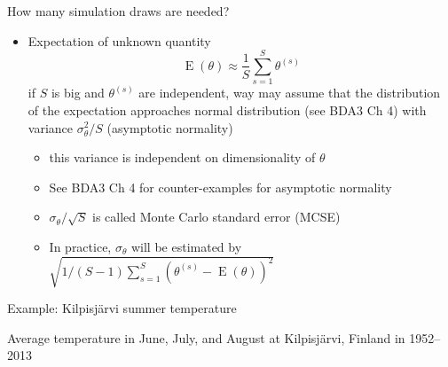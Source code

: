 \documentclass[english,t]{beamer}
\DeclareMathOperator{\E}{E}
\begin{document}
\begin{frame}{How many simulation draws are needed?}

  \begin{itemize}
  \item Expectation of unknown quantity
    \begin{equation*}
      \E(\theta)\approx \frac{1}{S}\sum_{s=1}^S \theta^{(s)}
    \end{equation*}
    if $S$ is big and $\theta^{(s)}$ are independent, way may assume
    that the distribution of the expectation approaches normal
    distribution (see BDA3 Ch 4) with variance $\sigma^2_\theta/S$
    (asymptotic normality)
    \begin{itemize}
    \item this variance is independent on dimensionality of $\theta$
      \pause
    \item See BDA3 Ch 4 for counter-examples for asymptotic normality
      \pause
    \item $\sigma_\theta/\sqrt{S}$ is called Monte Carlo standard
      error (MCSE)
      \pause
      \item In practice, $\sigma_{\theta}$ will be estimated by $ \sqrt{1/(S-1)\sum_{s = 1}^S (\theta^{(s)} - \E(\theta))^2}$
    \end{itemize}
\end{itemize}

\end{frame}

\begin{frame}{Example: Kilpisjärvi summer temperature}

  Average temperature in June, July, and August at Kilpisjärvi,
  Finland in 1952--2013

  \begin{center}
  \end{center}

\end{frame}
\end{document}
